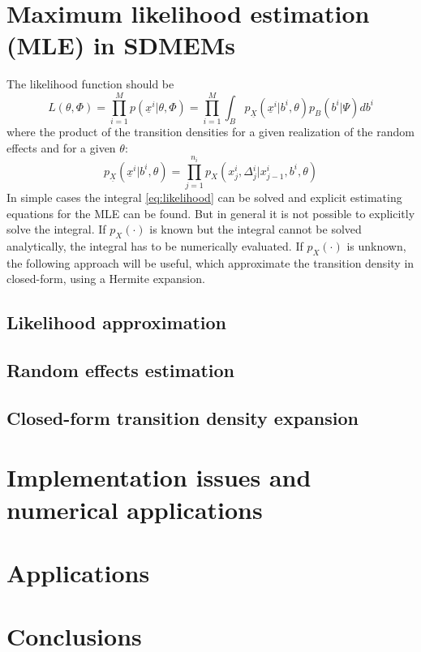 \documentclass[12pt]{extarticle}
\begin{document}
\section{Maximum likelihood estimation (MLE) in SDMEMs}
The likelihood function should be
\begin{equation}
L(\theta{},\Phi{})=\prod_{i=1}^{M}p(\underline{x}^{i}|\theta{},\Phi{})=\prod_{i=1}^{M}\int_{B}p_{\underline{X}}(\underline{x}^{i}|b^{i},\theta{})p_{B}(b^{i}|\Psi)db^{i} \label{eq:likelihood}
\end{equation}
where the product of the transition densities for a given realization of the random effects and for a given $\theta$:
\begin{equation}
p_{\underline{X}}(\underline{x}^{i}|b^{i},\theta{})=\prod_{j=1}^{n_{i}}p_{X}(x_{j}^{i},\Delta{}_{j}^{i}|x_{j-1}^{i},b^{i},\theta)
\end{equation}
In simple cases the integral \eqref{eq:likelihood} can be solved and explicit estimating equations for the MLE can be found. But in general it is not possible to explicitly solve the integral. If $p_{X}(\cdot)$ is known but the integral cannot be solved analytically, the integral has to be numerically evaluated. If $p_{X}(\cdot)$ is unknown, the following approach will be useful, which approximate the transition density in closed-form, using a Hermite expansion.
\subsection{Likelihood approximation}
\subsection{Random effects estimation}
\subsection{Closed-form transition density expansion}
\section{Implementation issues and numerical applications}
\section{Applications}
\section{Conclusions}
\end{document}

